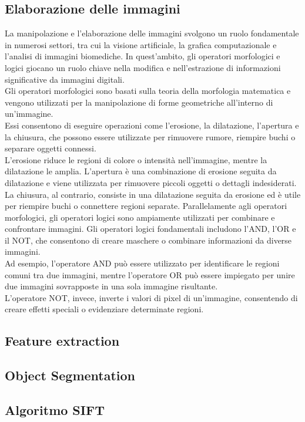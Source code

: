 \documentclass[a4paper,12pt]{report}
\begin{document}
\subsection{Elaborazione delle immagini}
La manipolazione e l'elaborazione delle immagini svolgono un ruolo fondamentale in numerosi settori, tra cui la visione artificiale, la grafica computazionale e l'analisi di immagini biomediche. 
In quest'ambito, gli operatori morfologici e logici giocano un ruolo chiave nella modifica e nell'estrazione di informazioni significative da immagini digitali. \\
Gli operatori morfologici sono basati sulla teoria della morfologia matematica e vengono utilizzati per la manipolazione di forme geometriche all'interno di un'immagine. \\
Essi consentono di eseguire operazioni come l'erosione, la dilatazione, l'apertura e la chiusura, che possono essere utilizzate per rimuovere rumore, riempire buchi o separare oggetti connessi. \\
L'erosione riduce le regioni di colore o intensità nell'immagine, mentre la dilatazione le amplia. L'apertura è una combinazione di erosione seguita da dilatazione e viene utilizzata per rimuovere piccoli oggetti o dettagli indesiderati. La chiusura, al contrario, consiste in una dilatazione seguita da erosione ed è utile per riempire buchi o connettere regioni separate.
Parallelamente agli operatori morfologici, gli operatori logici sono ampiamente utilizzati per combinare e confrontare immagini. Gli operatori logici fondamentali includono l'AND, l'OR e il NOT, che consentono di creare maschere o combinare informazioni da diverse immagini. \\
Ad esempio, l'operatore AND può essere utilizzato per identificare le regioni comuni tra due immagini, mentre l'operatore OR può essere impiegato per unire due immagini sovrapposte in una sola immagine risultante. \\
L'operatore NOT, invece, inverte i valori di pixel di un'immagine, consentendo di creare effetti speciali o evidenziare determinate regioni.

\subsection{Feature extraction}
\subsection{Object Segmentation}
\subsection{Algoritmo SIFT}
\end{document}

